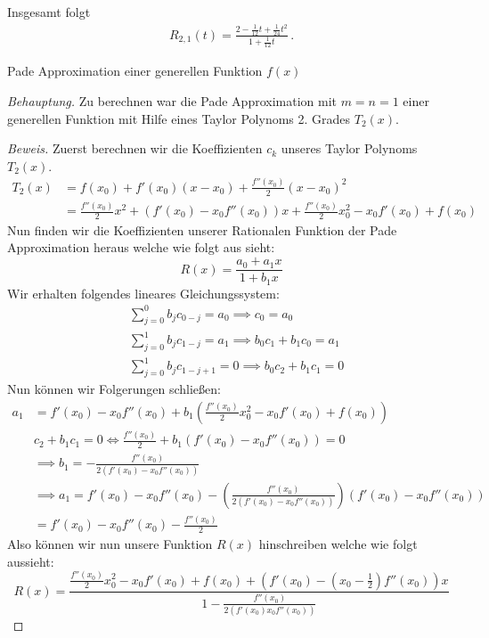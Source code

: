 \documentclass[a4paper]{article}
\newcommand{\beh}{\textit{Behauptung. }}
\newenvironment{Aufgabe}[2][Aufgabe]{\begin{trivlist}
\item[\hskip \labelsep {\bfseries #1}\hskip \labelsep {\bfseries #2.}]}{\end{trivlist}}
\begin{document}
    Insgesamt folgt
    \begin{align*}
      R_{2,1}(t) = \frac{2 - \frac{1}{12}t + \frac{1}{24}t^2}{1 + \frac{1}{12}t}\,.
    \end{align*}

\begin{theorem} %
\begin{Aufgabe}{5} %
	Pade Approximation einer generellen Funktion $f(x)$ 
\end{Aufgabe}

\beh Zu berechnen war die Pade Approximation mit $m=n=1$ einer generellen
Funktion mit Hilfe eines Taylor Polynoms 2. Grades $T_2(x)$.

\begin{proof}[Beweis]
	Zuerst berechnen wir die Koeffizienten $c_k$ unseres Taylor Polynoms $T_2(x)$.
	\begin{align*}
		T_2(x) &= f(x_0) + f' (x_0)(x-x_0) + \frac{ f'' (x_0) }{ 2 }(x-x_0) ^2 \\
			   &= \frac{ f''(x_0) }{ 2 }x ^2
			   + (f'(x_0) - x_0 f''(x_0)) x
			   + \frac{ f ''(x_0) }{ 2 }x_0 ^2 - x_0 f'(x_0) + f(x_0)
	\end{align*}
	Nun finden wir die Koeffizienten unserer Rationalen Funktion der Pade Approximation
	heraus welche wie folgt aus sieht:
	\[
		R(x) = \frac{ a_0 + a_1 x }{ 1 + b_1 x }
	\]
	Wir erhalten folgendes lineares Gleichungssystem:
	\begin{align}
		&\sum_{j=0}^{0} b_j c_{0-j} = a_0 \implies
		c_0 = a_0 \\
		&\sum_{j=0}^{1} b_{j} c_{1-j} = a_1 \implies
		b_0 c_1 + b_1 c_0 = a_1 \\
		&\sum_{j=0}^{1} b_{j} c_{1-j+1} = 0 \implies
		b_0 c_2 + b_1 c_1 = 0
	\end{align}
	Nun können wir Folgerungen schließen:
	\begin{align*}
		a_1 &= f'(x_0) - x_0 f''(x_0) + b_1 \left(
			\frac{ f ''(x_0) }{ 2 } x_0 ^2 - x_0 f'(x_0) + f(x_0)
		\right) \\
			&c_2 + b_1 c_1 = 0 \Leftrightarrow 
			\frac{ f ''(x_0) }{ 2 } + b_1 \left(
				f' (x_0) - x_0 f ''(x_0)
			\right) = 0 \\
			& \implies b_1 = 
			- \frac{ f ''(x_0) }{ 2 \left(
					f' (x_0) - x_0 f ''(x_0)
			\right) } \\
			& \implies a_1 = 
			f' (x_0) - x_0 f ''(x_0) - \left(
				\frac{ f ''(x_0) }{ 2 (f'(x_0) - x_0 f ''(x_0) ) }
			\right) ( f'(x_0) - x_0 f ''(x_0) ) \\
			&= f'(x_0) - x_0 f ''(x_0) - \frac{ f ''(x_0) }{ 2 }
	\end{align*}
	Also können wir nun unsere Funktion $R(x)$ hinschreiben welche wie folgt aussieht:
	\[
		R(x) = \frac{ 
			\frac{ f ''(x_0) }{ 2 }x_0 ^2 - x_0 f'(x_0) + f(x_0) +
			\left(
				f'(x_0) - (x_0 - \frac{ 1 }{ 2 }) f ''(x_0)
			\right) x
		}{ 1 - \frac{ f ''(x_0) }{ 2 \left(
				f' (x_0) x_0 f ''(x_0)
		\right)  } }
	\] 
\end{proof}
\end{theorem}
\end{document}

